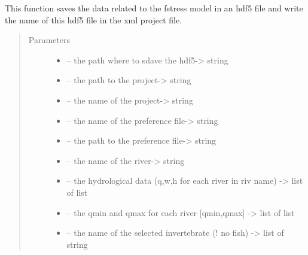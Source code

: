 \documentclass[letterpaper,10pt,english]{sphinxmanual}
\begin{document}

\begin{fulllineitems}
\label{\detokenize{index:src.fstress.save_fstress}}
This function saves the data related to the fstress model in an hdf5 file and write the name of this hdf5 file
in the xml project file.
\begin{quote}\begin{description}
\item[{Parameters}] \leavevmode\begin{itemize}
\item {} 
 -- the path where to sdave the hdf5-\textgreater{} string

\item {} 
 -- the path to the project-\textgreater{} string

\item {} 
 -- the name of the project-\textgreater{} string

\item {} 
 -- the name of the preference file-\textgreater{} string

\item {} 
 -- the path to the preference file-\textgreater{} string

\item {} 
 -- the name of the river-\textgreater{} string

\item {} 
 -- the hydrological data (q,w,h for each river in riv name) -\textgreater{} list of list

\item {} 
 -- the qmin and qmax for each river {[}qmin,qmax{]} -\textgreater{} list of list

\item {} 
 -- the name of the selected invertebrate (! no fish) -\textgreater{} list of string

\end{itemize}

\end{description}\end{quote}

\end{fulllineitems}
\end{document}
